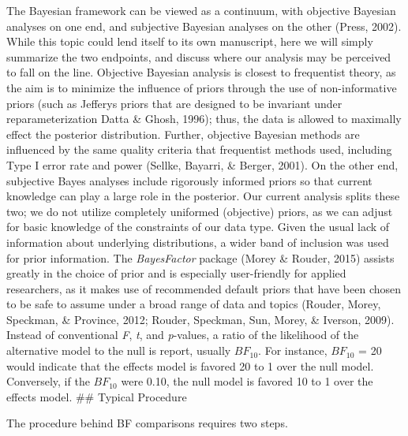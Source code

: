 \documentclass[english,man]{apa6}
\theoremstyle{definition}
\theoremstyle{definition}
\theoremstyle{definition}
\theoremstyle{remark}
\begin{document}
The Bayesian framework can be viewed as a continuum, with objective
Bayesian analyses on one end, and subjective Bayesian analyses on the
other (Press, 2002). While this topic could lend itself to its own
manuscript, here we will simply summarize the two endpoints, and discuss
where our analysis may be perceived to fall on the line. Objective
Bayesian analysis is closest to frequentist theory, as the aim is to
minimize the influence of priors through the use of non-informative
priors (such as Jefferys priors that are designed to be invariant under
reparameterization Datta \& Ghosh, 1996); thus, the data is allowed to
maximally effect the posterior distribution. Further, objective Bayesian
methods are influenced by the same quality criteria that frequentist
methods used, including Type I error rate and power (Sellke, Bayarri, \&
Berger, 2001). On the other end, subjective Bayes analyses include
rigorously informed priors so that current knowledge can play a large
role in the posterior. Our current analysis splits these two; we do not
utilize completely uniformed (objective) priors, as we can adjust for
basic knowledge of the constraints of our data type. Given the usual
lack of information about underlying distributions, a wider band of
inclusion was used for prior information. The \emph{BayesFactor} package
(Morey \& Rouder, 2015) assists greatly in the choice of prior and is
especially user-friendly for applied researchers, as it makes use of
recommended default priors that have been chosen to be safe to assume
under a broad range of data and topics (Rouder, Morey, Speckman, \&
Province, 2012; Rouder, Speckman, Sun, Morey, \& Iverson, 2009). Instead
of conventional \emph{F}, \emph{t}, and \emph{p}-values, a ratio of the
likelihood of the alternative model to the null is report, usually
\(BF_{10}\). For instance, \(BF_{10}\) = 20 would indicate that the
effects model is favored 20 to 1 over the null model. Conversely, if the
\(BF_{10}\) were 0.10, the null model is favored 10 to 1 over the
effects model. \#\# Typical Procedure

The procedure behind BF comparisons requires two steps.
\end{document}
